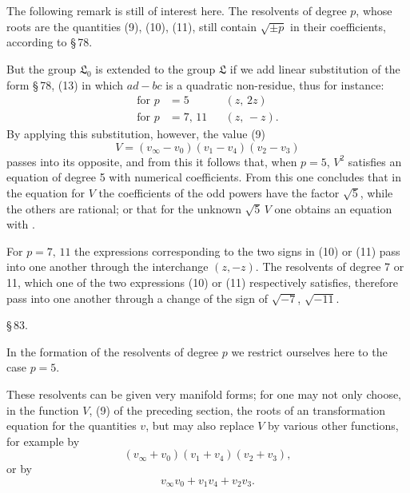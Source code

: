 The following remark is still of interest here. The resolvents of degree $p$, whose roots are the quantities (9), (10), (11), still contain $\sqrt{\pm p}$ in their coefficients, according to §\,78.

But the group $\mathfrak{L}_0$ is extended to the group $\mathfrak{L}$ if we add  linear substitution of the form §\,78, (13) in which $ad - bc$ is a quadratic non-residue, thus for instance: %
\[
\begin{aligned}
\text{for } p&=5 & &(z,\,2z)\\
\text{for } p&=7,\,11 & &(z,\,-z).
\end{aligned}
\]
By applying this substitution, however, the value (9)
\[
V = (v_\infty - v_0)(v_1 - v_4)(v_2 - v_3)
\]
passes into its opposite, and from this it follows that, when $p=5$, $V^2$ satisfies an equation of degree 5 with  numerical coefficients. From this one concludes that in the equation for $V$ the coefficients of the odd powers have the factor $\sqrt5$, while the others are rational; or that for the unknown $\sqrt5\,V$ one obtains an equation with .

For $p=7,\,11$ the expressions corresponding to the two signs in (10) or (11) pass into one another through the interchange $(z,-z)$. The resolvents of degree 7 or 11, which one of the two expressions (10) or (11) respectively satisfies, therefore pass into one another through a change of the sign of $\sqrt{-7}$, $\sqrt{-11}$.

§\,83. 

In the formation of the resolvents of degree $p$ we restrict ourselves here to the case $p=5$.

These resolvents can be given very manifold forms; for one may not only choose, in the function $V$, (9) of the preceding section, the roots of an  transformation equation for the quantities $v$, but may also replace $V$ by various other functions, for example by
\[
(v_\infty + v_0)(v_1+v_4)(v_2+v_3),
\]
or by
\[
v_\infty v_0 + v_1 v_4 + v_2 v_3.
\]
